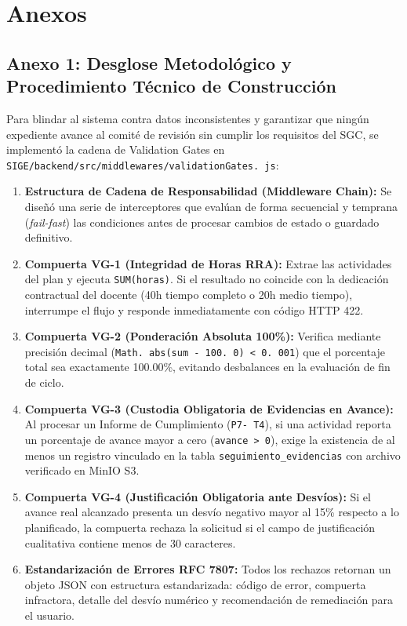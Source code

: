 \documentclass[12pt,a4paper]{article}
\begin{document}
\vspace{0.4cm}

\section{Anexos}

\subsection*{Anexo 1: Desglose Metodológico y Procedimiento Técnico de Construcción}
Para blindar al sistema contra datos inconsistentes y garantizar que ningún expediente avance al comité de revisión sin cumplir los requisitos del SGC, se implementó la cadena de Validation Gates en \texttt{SIGE/\allowbreak  backend/\allowbreak  src/\allowbreak  middlewares/\allowbreak  validationGates. js}:

\begin{enumerate}[leftmargin=1.5em, itemsep=3pt]
    \item \textbf{Estructura de Cadena de Responsabilidad (Middleware Chain):} Se diseñó una serie de interceptores que evalúan de forma secuencial y temprana (\textit{fail-fast}) las condiciones antes de procesar cambios de estado o guardado definitivo.
    \item \textbf{Compuerta VG-1 (Integridad de Horas RRA):} Extrae las actividades del plan y ejecuta \texttt{SUM(horas)}. Si el resultado no coincide con la dedicación contractual del docente (40h tiempo completo o 20h medio tiempo), interrumpe el flujo y responde inmediatamente con código HTTP 422.
    \item \textbf{Compuerta VG-2 (Ponderación Absoluta 100\%):} Verifica mediante precisión decimal (\texttt{Math. abs(sum - 100. 0) < 0. 001}) que el porcentaje total sea exactamente 100.00\%, evitando desbalances en la evaluación de fin de ciclo.
    \item \textbf{Compuerta VG-3 (Custodia Obligatoria de Evidencias en Avance):} Al procesar un Informe de Cumplimiento (\texttt{P7- T4}), si una actividad reporta un porcentaje de avance mayor a cero (\texttt{avance > 0}), exige la existencia de al menos un registro vinculado en la tabla \texttt{seguimiento\_\allowbreak  evidencias} con archivo verificado en MinIO S3.
    \item \textbf{Compuerta VG-4 (Justificación Obligatoria ante Desvíos):} Si el avance real alcanzado presenta un desvío negativo mayor al 15\% respecto a lo planificado, la compuerta rechaza la solicitud si el campo de justificación cualitativa contiene menos de 30 caracteres.
    \item \textbf{Estandarización de Errores RFC 7807:} Todos los rechazos retornan un objeto JSON con estructura estandarizada: código de error, compuerta infractora, detalle del desvío numérico y recomendación de remediación para el usuario.
\end{enumerate}
\end{document}
